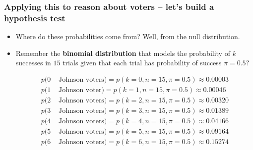 \documentclass[aspectratio=169]{beamer}
\theoremstyle{principle}
\begin{document}
\begin{frame}
\frametitle{Applying this to reason about voters -- let's build a hypothesis test}

\begin{itemize}

\item Where do these probabilities come from?  Well, from the null distribution.
\bigskip

\item Remember the \textbf{binomial distribution} that models the probability of $k$ successes in $15$ trials given that each trial has probability of success $\pi = 0.5$?\color{black}

\begin{align*}
p(0& \mbox{ Johnson voters}) = p(k=0,n=15,\pi=0.5) \approx 0.00003\\
p(1& \mbox{ Johnson voter}) = p(k=1,n=15,\pi=0.5) \approx 0.00046\\
p(2& \mbox{ Johnson voters}) = p(k=2,n=15,\pi=0.5)\approx 0.00320\\
p(3& \mbox{ Johnson voters}) = p(k=3,n=15,\pi=0.5)\approx 0.01389\\
p(4& \mbox{ Johnson voters}) = p(k=4,n=15,\pi=0.5)\approx 0.04166\\
p(5& \mbox{ Johnson voters}) = p(k=5,n=15,\pi=0.5)\approx 0.09164\\
p(6& \mbox{ Johnson voters}) = p(k=6,n=15,\pi=0.5)\approx 0.15274
\end{align*}

\end{itemize}

\end{frame}

%

%
%
%
%
%
%
%
\end{document}
